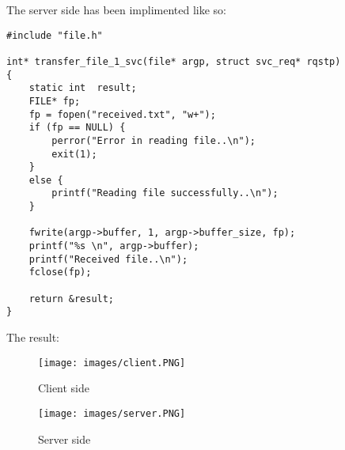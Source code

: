\documentclass[]{article}
\begin{document}
\noindent%
The server side has been implimented like so: 
\begin{verbatim}
#include "file.h"

int* transfer_file_1_svc(file* argp, struct svc_req* rqstp)
{
	static int  result;
	FILE* fp;
	fp = fopen("received.txt", "w+");
	if (fp == NULL) {
		perror("Error in reading file..\n");
		exit(1);
	}
	else {
		printf("Reading file successfully..\n");
	}

	fwrite(argp->buffer, 1, argp->buffer_size, fp);
	printf("%s \n", argp->buffer);
	printf("Received file..\n");
	fclose(fp);

	return &result;
}
\end{verbatim}
\noindent%
The result:
\begin{figure}[H]
    \centering
    \texttt{[image: images/client.PNG]}
    \caption{Client side}
\end{figure}

\begin{figure}[H]
    \centering
    \texttt{[image: images/server.PNG]}
    \caption{Server side}
\end{figure}
\end{document}
